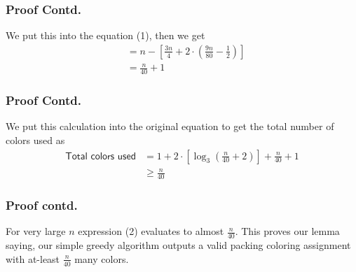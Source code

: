 \begin{frame}
    \frametitle{Proof Contd.}

    We put this into the equation (1), then we get
    \begin{align*}
        &= n - \left[\frac{3n}{4} + 2 \cdot \left(\frac{9n}{80} - \frac{1}{2}\right)\right]\\
        &= \frac{n}{40} + 1
    \end{align*}    

\end{frame}

\begin{frame}
    \frametitle{Proof Contd.}

    We put this calculation into the original equation to get the total number of colors used as
    \begin{align}
        \textsf{Total colors used} &= 1 + 2 \cdot \left[\log_3\left(\frac{n}{40} + 2\right)\right] + \frac{n}{40} + 1\\
        &\geq \frac{n}{40}
    \end{align}

\end{frame}

\begin{frame}
    \frametitle{Proof contd.}

    For very large $n$ expression (2) evaluates to almost $\frac{n}{40}$. This proves our lemma saying, our simple greedy algorithm outputs a valid packing coloring assignment with at-least $\frac{n}{40}$ many colors.    

\end{frame}